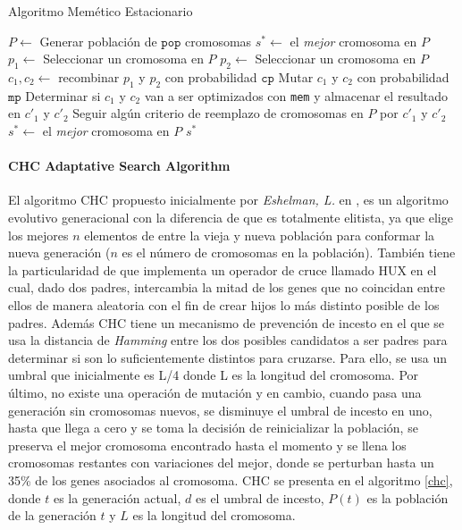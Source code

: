 \begin{algorithm}
\caption{Algoritmo Memético Estacionario}
\label{ssma}
\begin{algorithmic}[1]


\State $P \gets$ Generar población de $\texttt{pop}$ cromosomas
\State $s^* \gets $ el \emph{mejor} cromosoma en $P$
	\State $p_1 \gets$ Seleccionar un cromosoma en $P$
	\State $p_2 \gets$ Seleccionar un cromosoma en $P$
	\State $c_1, c_2 \gets $ recombinar $p_1$ y $p_2$ con probabilidad $\texttt{cp}$
	\State Mutar $c_1$ y $c_2$ con probabilidad $\texttt{mp}$
	\State Determinar si $c_1$ y $c_2$ van a ser optimizados con \texttt{mem} y almacenar el resultado en $c'_1$ y $c'_2$
	\State Seguir algún criterio de reemplazo de cromosomas en $P$ por $c'_1$ y $c'_2$
		\State $s^* \gets$ el \emph{mejor} cromosoma en $P$
	\EndIf
\EndWhile
\State \Return $s^*$

\end{algorithmic}
\end{algorithm}

\paragraph{CHC Adaptative Search Algorithm}

El algoritmo CHC propuesto inicialmente por \emph{Eshelman, L.} en \cite{eshelman1991chc}, es un algoritmo evolutivo generacional con la diferencia de que es totalmente elitista, ya que elige los mejores $n$ elementos de entre la vieja y nueva población para conformar la nueva generación ($n$ es el número de cromosomas en la población). También tiene la particularidad de que implementa un operador de cruce llamado HUX en el cual, dado dos padres, intercambia la mitad de los genes que no coincidan entre ellos de manera aleatoria con el fin de crear hijos lo más distinto posible de los padres. Además CHC tiene un mecanismo de prevención de incesto en el que se usa la distancia de \emph{Hamming} entre los dos posibles candidatos a ser padres para determinar si son lo suficientemente distintos para cruzarse. Para ello, se usa un umbral que inicialmente es L/4 donde L es la longitud del cromosoma. Por último, no existe una operación de mutación y en cambio, cuando pasa una generación sin cromosomas nuevos, se disminuye el umbral de incesto en uno, hasta que llega a cero y se toma la decisión de reinicializar la población, se preserva el mejor cromosoma encontrado hasta el momento y se llena los cromosomas restantes con variaciones del mejor, donde se perturban hasta un 35\% de los genes asociados al cromosoma. CHC se presenta en el algoritmo \ref{chc}, donde $t$ es la generación actual, $d$ es el umbral de incesto, $P(t)$ es la población de la generación $t$ y $L$ es la longitud del cromosoma.

